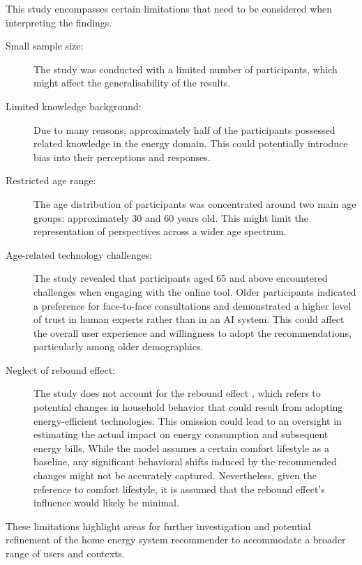 This study encompasses certain limitations that need to be considered when interpreting the findings.
\begin{description}
    \item[Small sample size:] The study was conducted with a limited number of participants, which might affect the generalisability of the results.
    \item[Limited knowledge background:] Due to many reasons, approximately half of the participants possessed related knowledge in the energy domain. This could potentially introduce bias into their perceptions and responses.
    \item[Restricted age range:] The age distribution of participants was concentrated around two main age groups: approximately 30 and 60 years old. This might limit the representation of perspectives across a wider age spectrum.
    \item[Age-related technology challenges:] The study revealed that participants aged 65 and above encountered challenges when engaging with the online tool. Older participants indicated a preference for face-to-face consultations and demonstrated a higher level of trust in human experts rather than in an AI system. This could affect the overall user experience and willingness to adopt the recommendations, particularly among older demographics.
    \item[Neglect of rebound effect:] The study does not account for the rebound effect \cite{Herring2007}, which refers to potential changes in household behavior that could result from adopting energy-efficient technologies. This omission could lead to an oversight in estimating the actual impact on energy consumption and subsequent energy bills. While the model assumes a certain comfort lifestyle as a baseline, any significant behavioral shifts induced by the recommended changes might not be accurately captured. Nevertheless, given the reference to comfort lifestyle, it is assumed that the rebound effect's influence would likely be minimal.
\end{description}
These limitations highlight areas for further investigation and potential refinement of the home energy system recommender to accommodate a broader range of users and contexts.